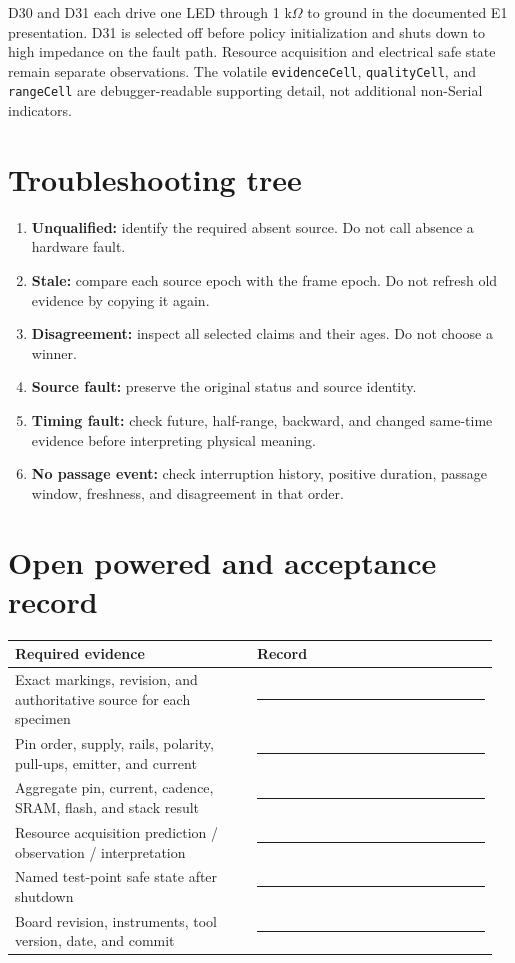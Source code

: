 \documentclass[11pt]{article}
\begin{document}
D30 and D31 each drive one LED through 1 k\(\Omega\) to ground in the
documented E1 presentation. D31 is selected off before policy initialization
and shuts down to high impedance on the fault path. Resource acquisition and
electrical safe state remain separate observations. The volatile
\texttt{evidenceCell}, \texttt{qualityCell}, and \texttt{rangeCell} are
debugger-readable supporting detail, not additional non-Serial indicators.

\section{Troubleshooting tree}
\begin{enumerate}
 \item \textbf{Unqualified:} identify the required absent source. Do not call
       absence a hardware fault.
 \item \textbf{Stale:} compare each source epoch with the frame epoch. Do not
       refresh old evidence by copying it again.
 \item \textbf{Disagreement:} inspect all selected claims and their ages. Do
       not choose a winner.
 \item \textbf{Source fault:} preserve the original status and source identity.
 \item \textbf{Timing fault:} check future, half-range, backward, and changed
       same-time evidence before interpreting physical meaning.
 \item \textbf{No passage event:} check interruption history, positive
       duration, passage window, freshness, and disagreement in that order.
\end{enumerate}

\section{Open powered and acceptance record}
\begin{tabularx}{\linewidth}{@{}p{0.48\linewidth}p{0.48\linewidth}@{}}
\toprule
Required evidence & Record\\
\midrule
Exact markings, revision, and authoritative source for each specimen & \rule{0.42\linewidth}{0.4pt}\\
Pin order, supply, rails, polarity, pull-ups, emitter, and current & \rule{0.42\linewidth}{0.4pt}\\
Aggregate pin, current, cadence, SRAM, flash, and stack result & \rule{0.42\linewidth}{0.4pt}\\
Resource acquisition prediction / observation / interpretation & \rule{0.42\linewidth}{0.4pt}\\
Named test-point safe state after shutdown & \rule{0.42\linewidth}{0.4pt}\\
Board revision, instruments, tool version, date, and commit & \rule{0.42\linewidth}{0.4pt}\\
\bottomrule
\end{tabularx}
\end{document}
